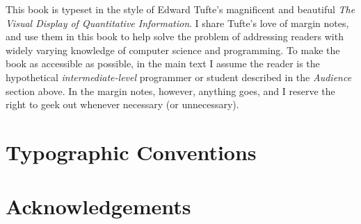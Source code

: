 This book is typeset in the style of Edward Tufte's
magnificent and beautiful \emph{The Visual Display of
  Quantitative Information}\cite{Tufte:1986:VDQ:33404}.  I share
Tufte's love of margin notes, and use them in this book to help solve the problem of addressing readers with
widely varying knowledge of computer science and programming.
%
To make the book as accessible as possible, in the main text I assume
the reader is the hypothetical \emph{intermediate-level} programmer or
student described in the \emph{Audience} section above.
%
In the margin notes, however, anything goes, and I reserve the right
to geek out whenever necessary (or unnecessary).


\section{Typographic Conventions}\label{sec:preface:typographic-conventions}



\section{Acknowledgements}\label{sec:preface:acknowledgements}




%
%
%
%
%
%
%
%

